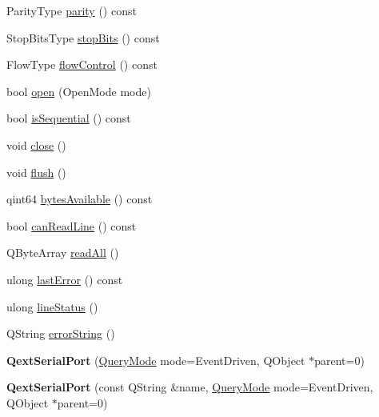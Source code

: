 \begin{DoxyCompactItemize}
Parity\+Type \mbox{\hyperlink{class_qext_serial_port_adc80d1c0705ed88b6472883937ad3c20}{parity}} () const
\item 
Stop\+Bits\+Type \mbox{\hyperlink{class_qext_serial_port_ac555d2bc67a6f1a4f389c54f3a3d5f60}{stop\+Bits}} () const
\item 
Flow\+Type \mbox{\hyperlink{class_qext_serial_port_a54adc33c948296a4fdfae02bca62a8a9}{flow\+Control}} () const
\item 
bool \mbox{\hyperlink{class_qext_serial_port_a2afbc8095ef88403b74378933332d287}{open}} (Open\+Mode mode)
\item 
bool \mbox{\hyperlink{class_qext_serial_port_a4174ec4c484016e26eaea53edd252e26}{is\+Sequential}} () const
\item 
void \mbox{\hyperlink{class_qext_serial_port_a5ae591df94fc66ccb85cbb6565368bca}{close}} ()
\item 
void \mbox{\hyperlink{class_qext_serial_port_adac116554b543b7c4228c018a85882f5}{flush}} ()
\item 
qint64 \mbox{\hyperlink{class_qext_serial_port_ada77ba7eed0c66635d6d856e43d30556}{bytes\+Available}} () const
\item 
bool \mbox{\hyperlink{class_qext_serial_port_a05b7cf4fc998401b7cf8a8851fdd7a02}{can\+Read\+Line}} () const
\item 
Q\+Byte\+Array \mbox{\hyperlink{class_qext_serial_port_a3b6261ecdae0766f83d351e39be9130d}{read\+All}} ()
\item 
ulong \mbox{\hyperlink{class_qext_serial_port_a90581222a3c66b51c3a93e4e912a736b}{last\+Error}} () const
\item 
ulong \mbox{\hyperlink{class_qext_serial_port_ab4ef88876c6435d0badc05cef9a4a34c}{line\+Status}} ()
\item 
Q\+String \mbox{\hyperlink{class_qext_serial_port_af799a7684337babb971e2e0d8cda7cf1}{error\+String}} ()
\item 
\mbox{\label{class_qext_serial_port_af9bd56447247a8f2b561592f53cf063f}} 
{\bfseries Qext\+Serial\+Port} (\mbox{\hyperlink{class_qext_serial_port_a269e1f3656224a10c321bd70ab89cf64}{Query\+Mode}} mode=Event\+Driven, Q\+Object $\ast$parent=0)
\item 
\mbox{\label{class_qext_serial_port_ab0376896b79bb9dc099bf102f01e5afa}} 
{\bfseries Qext\+Serial\+Port} (const Q\+String \&name, \mbox{\hyperlink{class_qext_serial_port_a269e1f3656224a10c321bd70ab89cf64}{Query\+Mode}} mode=Event\+Driven, Q\+Object $\ast$parent=0)

\end{DoxyCompactItemize}
